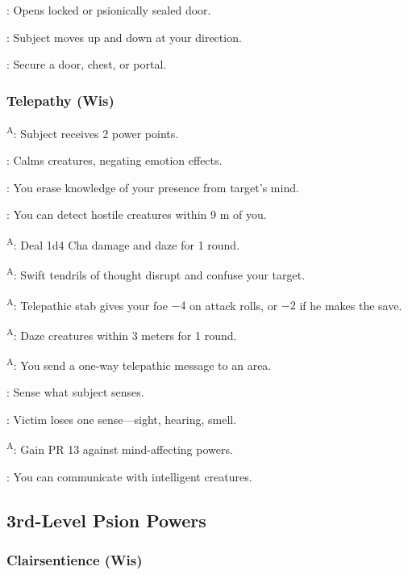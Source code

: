 : Opens locked or psionically sealed door.

: Subject moves up and down at your direction.

: Secure a door, chest, or portal.


\subsubsection{Telepathy (Wis)}

\textsuperscript{A}: Subject receives 2 power points.

: Calms creatures, negating emotion effects.

: You erase knowledge of your presence from target's mind.

: You can detect hostile creatures within 9 m of you.

\textsuperscript{A}: Deal 1d4 Cha damage and daze for 1 round.

\textsuperscript{A}: Swift tendrils of thought disrupt and confuse your target.

\textsuperscript{A}: Telepathic stab gives your foe $-4$ on attack rolls, or $-2$ if he makes the save.

\textsuperscript{A}: Daze creatures within 3 meters for 1 round.

\textsuperscript{A}: You send a one-way telepathic message to an area.

: Sense what subject senses.

: Victim loses one sense---sight, hearing, smell.

\textsuperscript{A}: Gain PR 13 against mind-affecting powers.

: You can communicate with intelligent creatures.



\subsection{3rd-Level Psion Powers}


\subsubsection{Clairsentience (Wis)}

